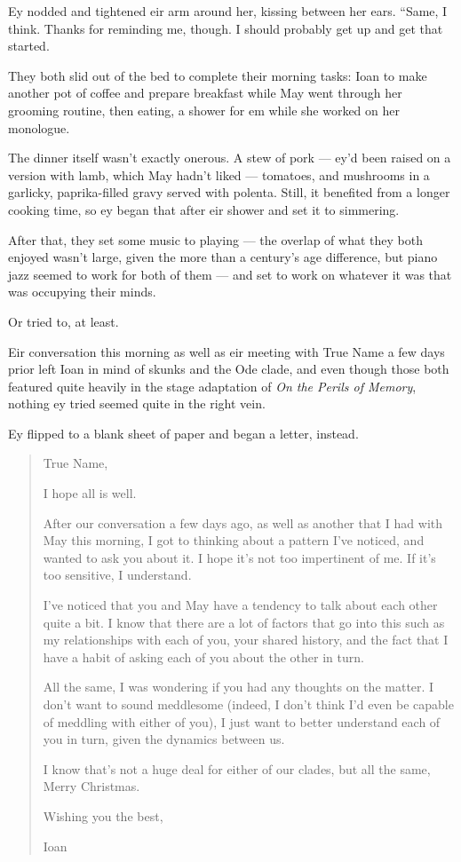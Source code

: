 Ey nodded and tightened eir arm around her, kissing between her ears. ``Same, I think. Thanks for reminding me, though. I should probably get up and get that started.

They both slid out of the bed to complete their morning tasks: Ioan to make another pot of coffee and prepare breakfast while May went through her grooming routine, then eating, a shower for em while she worked on her monologue.

The dinner itself wasn't exactly onerous. A stew of pork — ey'd been raised on a version with lamb, which May hadn't liked — tomatoes, and mushrooms in a garlicky, paprika-filled gravy served with polenta. Still, it benefited from a longer cooking time, so ey began that after eir shower and set it to simmering.

After that, they set some music to playing — the overlap of what they both enjoyed wasn't large, given the more than a century's age difference, but piano jazz seemed to work for both of them — and set to work on whatever it was that was occupying their minds.

Or tried to, at least.

Eir conversation this morning as well as eir meeting with True Name a few days prior left Ioan in mind of skunks and the Ode clade, and even though those both featured quite heavily in the stage adaptation of \emph{On the Perils of Memory}, nothing ey tried seemed quite in the right vein.

Ey flipped to a blank sheet of paper and began a letter, instead.

\begin{quote}
True Name,

I hope all is well.

After our conversation a few days ago, as well as another that I had with May this morning, I got to thinking about a pattern I've noticed, and wanted to ask you about it. I hope it's not too impertinent of me. If it's too sensitive, I understand.

I've noticed that you and May have a tendency to talk about each other quite a bit. I know that there are a lot of factors that go into this such as my relationships with each of you, your shared history, and the fact that I have a habit of asking each of you about the other in turn.

All the same, I was wondering if you had any thoughts on the matter. I don't want to sound meddlesome (indeed, I don't think I'd even be capable of meddling with either of you), I just want to better understand each of you in turn, given the dynamics between us.

I know that's not a huge deal for either of our clades, but all the same, Merry Christmas.

Wishing you the best,

Ioan
\end{quote}

